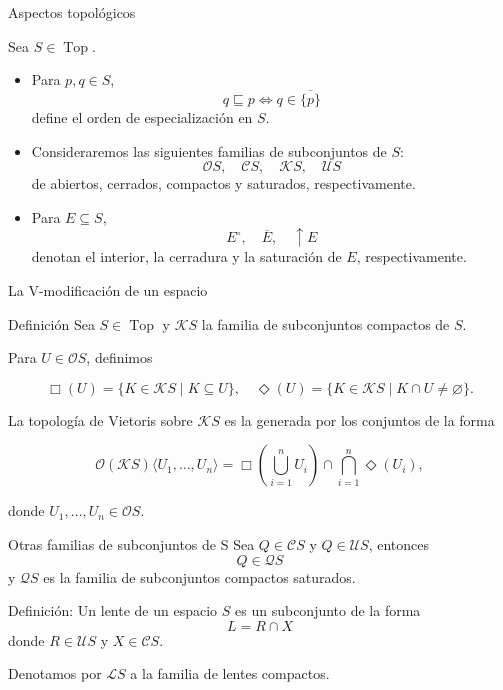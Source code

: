 \documentclass[compress,12pt]{beamer}
\DeclareMathOperator{\Top}{Top}
\begin{document}
\begin{frame}{Aspectos topológicos}

Sea \(S\in\Top\).

\begin{itemize}

\item<2-> Para \(p,q\in S\),
\[
q\sqsubseteq p
\iff
q\in\overline{\{p\}}
\]
define el orden de especialización en \(S\).

\vspace{2mm}

\item<3-> Consideraremos las siguientes familias de subconjuntos de \(S\):
\[
\mathcal{O}S,
\quad
\mathcal{C}S,
\quad
\mathcal{K}S,
\quad
\mathcal{U}S
\]
de abiertos, cerrados, compactos y saturados, respectivamente.

\vspace{2mm}

\item<4-> Para \(E\subseteq S\),
\[
E^\circ,
\quad
\overline{E},
\quad
\uparrow E
\]
denotan el interior, la cerradura y la saturación de \(E\), respectivamente.

\end{itemize}

\end{frame}
\begin{frame}{La V-modificación de un espacio}
    \begin{block}{Definición}
Sea \(S\in\Top\) y \(\mathcal{K}S\) la familia de subconjuntos compactos de \(S\).

\vspace{2mm}

Para \(U\in\mathcal{O}S\), definimos

\[
\Box(U)
=
\{K\in\mathcal{K}S\mid K\subseteq U\}, \quad
\Diamond(U)
=
\{K\in\mathcal{K}S\mid K\cap U\neq\varnothing\}.
\]

\vspace{2mm}

La topología de Vietoris sobre \(\mathcal{K}S\) es la generada por los conjuntos de la forma

\[
\mathcal{O}(\mathcal{K}S)\langle U_1,\dots,U_n\rangle
=
\Box\!\left(\bigcup_{i=1}^n U_i\right)
\cap
\bigcap_{i=1}^n \Diamond(U_i),
\]

donde \(U_1,\dots,U_n\in\mathcal{O}S\).
\end{block}
\end{frame}

\begin{frame}{Otras familias de subconjuntos de S}
Sea $Q\in \mathcal{C}S$ y $Q\in \mathcal{U}S$, entonces 
\[
Q\in\mathcal{Q}S
\]
y $\mathcal{Q}S$ es la familia de subconjuntos compactos saturados.

\begin{block}{Definición:}
Un lente de un espacio $S$ es un subconjunto de la forma
\[
L=R\cap X
\]
donde $R\in \mathcal{U}S$ y $X\in \mathcal{C}S$.
\end{block}
Denotamos por $\mathcal{L}S$ a la familia de lentes compactos.
\end{frame}
\end{document}
